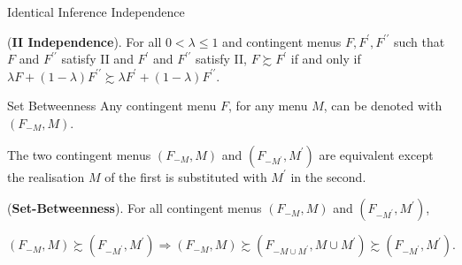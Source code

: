 \documentclass[usenames,dvipsnames,aspectratio=169,11pt, envcountsect, handout]{beamer}
\begin{document}
\begin{frame}{Identical Inference Independence}
	\begin{axiom}\label{ax:independence}
		(\textbf{II Independence}). For all \(0<\lambda \leq 1\) and contingent menus \(F, F^{\prime}, F^{\prime \prime} \) such that \(F\) and \(F^{\prime \prime}\) satisfy II and \(F^{\prime}\) and \(F^{\prime \prime}\) satisfy II, \(F \succsim F^{\prime}\) if and only if \(\lambda F+ \left( 1-\lambda \right) F^{\prime \prime} \succsim \lambda F^{\prime} + \left( 1-\lambda \right) F^{\prime \prime}\).
	\end{axiom}

\end{frame}

\begin{frame}{Set Betweenness}
	Any contingent menu \( F \), for any menu \( M \), can be denoted with \( \left( F_{-M}, M \right) \).

	\vfill

	The two contingent menus \( \left( F_{-M}, M \right) \) and \( \left( F_{-M^{\prime}}, M^{\prime} \right) \) are equivalent except the realisation \( M \) of the first is substituted with \( M^{\prime} \) in the second. \pause

	\vfill

	\begin{axiom}\label{ax:betweenness}
		(\textbf{Set-Betweenness}). For all contingent menus \( \left( F_{-M}, M \right) \) and \( \left( F_{-M^{\prime}}, M^{\prime} \right) \),

		\[
			\left( F_{-M}, M \right)  \succsim \left( F_{-M^{\prime}}, M^{\prime} \right) \Rightarrow \left( F_{-M}, M \right)  \succsim \left( F_{-M \cup M^{\prime}}, M \cup M^{\prime} \right) \succsim \left( F_{-M^{\prime}}, M^{\prime} \right) .
		\]

	\end{axiom}
\end{frame}
\end{document}
